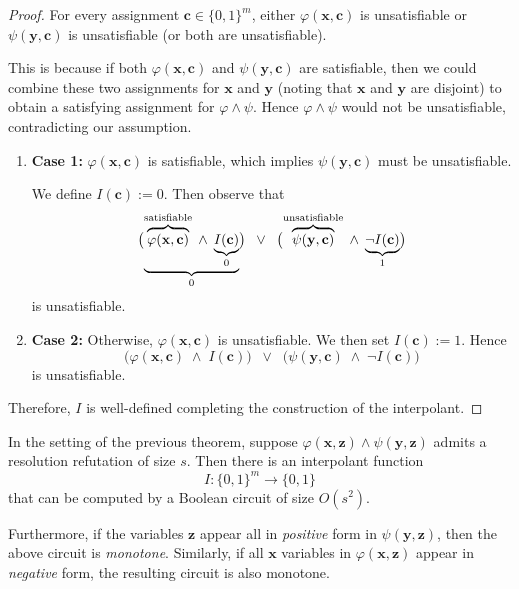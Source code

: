 \begin{proof}
For every assignment \(\mathbf{c} \in \{0,1\}^m\), either \(\varphi(\mathbf{x}, \mathbf{c})\) is unsatisfiable or \(\psi(\mathbf{y}, \mathbf{c})\) is unsatisfiable (or both are unsatisfiable). 

 
 
This is because if both \(\varphi(\mathbf{x},\mathbf{c})\) and \(\psi(\mathbf{y},\mathbf{c})\) are satisfiable, then we could combine these two assignments for \(\mathbf{x}\) and \(\mathbf{y}\) (noting that \(\mathbf{x}\) and \(\mathbf{y}\) are disjoint) to obtain a satisfying assignment for \(\varphi \wedge \psi\). Hence \(\varphi \wedge \psi\) would not be unsatisfiable, contradicting our assumption.

\begin{enumerate}[label=\textbf{(\alph*)}]
    \item \textbf{Case 1:} \(\varphi(\mathbf{x},\mathbf{c})\) is satisfiable, which implies \(\psi(\mathbf{y},\mathbf{c})\) must be unsatisfiable. 

    We define \( I(\mathbf{c}) := 0\). Then observe that
    \[
      \bigl(\underbrace{\overbrace{\varphi(\mathbf{x},\mathbf{c})}^{\rm satisfiable} \;\land\; \underbrace{I(\mathbf{c})}_{0}}_0\bigr)
      \;\;\lor\;\;
      \bigl(\overbrace{\psi(\mathbf{y},\mathbf{c}) }^{\rm unsatisfiable}\;\land\;\underbrace{\neg I(\mathbf{c})}_1\bigr)
    \]
    is unsatisfiable. 

    \item \textbf{Case 2:} Otherwise, \(\varphi(\mathbf{x},\mathbf{c})\) is unsatisfiable. We then set \(I(\mathbf{c}) := 1\). Hence
    \[
      \bigl(\varphi(\mathbf{x},\mathbf{c}) \;\land\; I(\mathbf{c})\bigr)
      \;\;\lor\;\;
      \bigl(\psi(\mathbf{y},\mathbf{c}) \;\land\;\neg I(\mathbf{c})\bigr)
    \]
    is unsatisfiable.

\end{enumerate}

\noindent
Therefore, \(I\) is well-defined completing the construction of the interpolant.
\end{proof}


\begin{theorem}
\label{thm:interpolation-circuit}
In the setting of the previous theorem, suppose 
\(\varphi(\mathbf{x},\mathbf{z}) \wedge \psi(\mathbf{y},\mathbf{z})\) 
admits a resolution refutation of size \(s\). Then there is an interpolant function 
\[
I \colon \{0,1\}^m \to \{0,1\}
\]
that can be computed by a Boolean circuit of size \(O(s^2)\).

Furthermore, if the variables \(\mathbf{z}\) appear all in \emph{positive} form in 
\(\psi(\mathbf{y},\mathbf{z})\), then the above circuit is \emph{monotone}. 
Similarly, if all \(\mathbf{x}\) variables in \(\varphi(\mathbf{x},\mathbf{z})\) 
appear in \emph{negative} form, the resulting circuit is also monotone.
\end{theorem}

